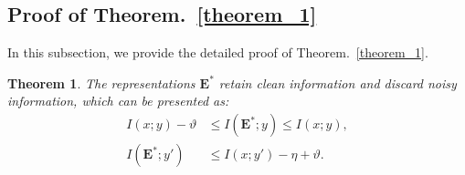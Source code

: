 \documentclass{article}
\theoremstyle{plain}
\newtheorem{theorem}{Theorem}[section]
\theoremstyle{definition}
\theoremstyle{remark}
\begin{document}
\subsection{Proof of Theorem.~\ref{theorem_1}}\label{the_proof}
In this subsection, we provide the detailed proof of Theorem.~\ref{theorem_1}. 
\begin{theorem}
The representations ${\textbf{E}^*}$ retain clean information and discard noisy information, which can be presented as:
\begin{equation}
\begin{aligned}
I(x;y)- \vartheta &\le I(\textbf{E}^*;y) \le I(x;y),\\
I(\textbf{E}^*;y') &\le I(x;y')-\eta + \vartheta.
\end{aligned}
\nonumber
\end{equation} 
\end{theorem} 
\end{document}
